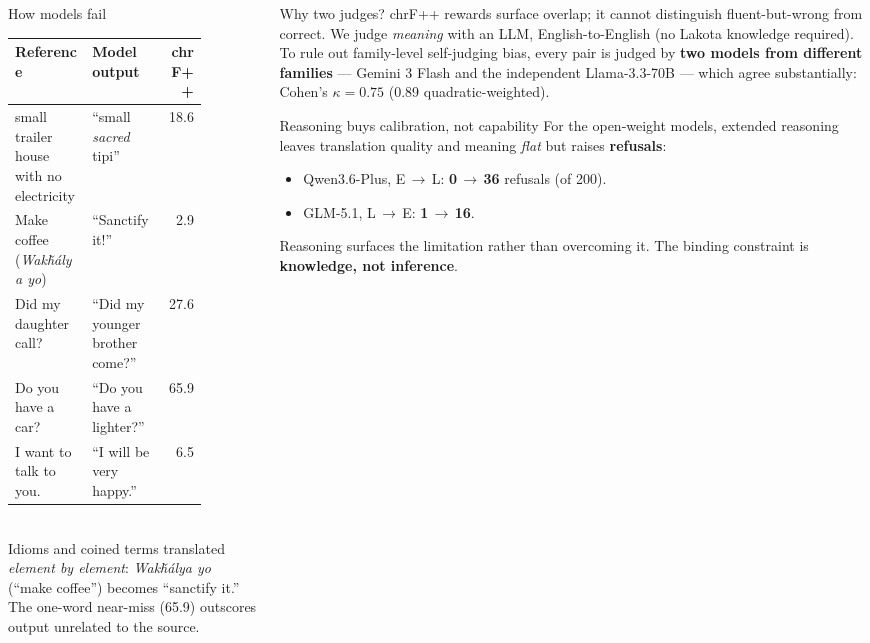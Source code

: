 \documentclass[final]{beamer}
\newcommand{\lak}[1]{\textit{#1}}
\begin{document}
\begin{frame}[t]
\begin{columns}[t]
\begin{column}{0.31\paperwidth}
\begin{block}{How models fail}
\footnotesize
\begin{tabular}{@{}p{0.40\linewidth}p{0.37\linewidth}r@{}}
\toprule
\textbf{Reference} & \textbf{Model output} & \textbf{chrF++} \\
\midrule
small trailer house with no electricity & ``small \textit{sacred} tipi'' & 18.6 \\[2pt]
Make coffee (\lak{Wakȟálya yo}) & ``Sanctify it!'' & 2.9 \\[2pt]
Did my daughter call? & ``Did my younger brother come?'' & 27.6 \\[2pt]
Do you have a car? & ``Do you have a lighter?'' & 65.9 \\[2pt]
I want to talk to you. & ``I will be very happy.'' & 6.5 \\
\bottomrule
\end{tabular}
\\[6pt]
{\footnotesize Idioms and coined terms translated \emph{element by element}: \lak{Wakȟálya yo} (``make coffee'') becomes ``sanctify it.'' The one-word near-miss (65.9) outscores output unrelated to the source.}
\end{block}

\end{column}

\begin{column}{0.31\paperwidth}

\begin{block}{Why two judges?}
chrF++ rewards surface overlap; it cannot distinguish fluent-but-wrong from correct. We judge \emph{meaning} with an LLM, English-to-English (no Lakota knowledge required). To rule out family-level self-judging bias, every pair is judged by \textbf{two models from different families} --- Gemini 3 Flash and the independent Llama-3.3-70B --- which agree substantially: Cohen's $\kappa=0.75$ (0.89 quadratic-weighted).
\end{block}

\begin{block}{Reasoning buys calibration, not capability}
For the open-weight models, extended reasoning leaves translation quality and meaning \emph{flat} but raises \textbf{refusals}:
\smallskip
\begin{itemize}
\item Qwen3.6-Plus, E\,$\rightarrow$\,L: \textbf{0\,$\rightarrow$\,36} refusals (of 200).
\item GLM-5.1, L\,$\rightarrow$\,E: \textbf{1\,$\rightarrow$\,16}.
\end{itemize}
\smallskip
Reasoning surfaces the limitation rather than overcoming it. The binding constraint is \textbf{knowledge, not inference}.
\end{block}


\end{column}
\end{columns}
\end{frame}
\end{document}
